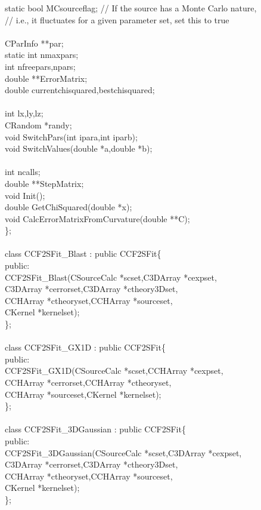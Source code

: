 \documentclass[10pt]{article}
\def\tab{\hspace*{9pt}}
\begin{document}
{\tab\tab  static bool MCsourceflag; // If the source has a Monte Carlo nature,\\ 
\tab\tab  // i.e., it fluctuates for a given parameter set, set this to true\\
\\
\tab\tab  CParInfo **par;\\
\tab\tab  static int nmaxpars;\\
\tab\tab  int nfreepars,npars;\\
\tab\tab  double **ErrorMatrix;\\
\tab\tab  double currentchisquared,bestchisquared;\\
\\
\tab\tab  int lx,ly,lz;\\
\tab\tab  CRandom *randy;\\
\tab\tab  void SwitchPars(int ipara,int iparb);\\
\tab\tab  void SwitchValues(double *a,double *b);\\
\\
\tab\tab  int ncalls;\\
\tab\tab  double **StepMatrix;\\
\tab\tab  void Init();\\
\tab\tab  double GetChiSquared(double *x);\\
\tab\tab  void CalcErrorMatrixFromCurvature(double **C);\\
\};\\
\\
class CCF2SFit\_Blast : public CCF2SFit\{\\
\tab public:\\
\tab\tab  CCF2SFit\_Blast(CSourceCalc *scset,C3DArray *cexpset,\\
\tab\tab		 C3DArray *cerrorset,C3DArray *ctheory3Dset,\\
\tab\tab		 CCHArray *ctheoryset,CCHArray *sourceset,\\
\tab\tab		 CKernel *kernelset);\\
\};\\
\\
class CCF2SFit\_GX1D : public CCF2SFit\{\\
\tab public:\\
\tab\tab  CCF2SFit\_GX1D(CSourceCalc *scset,CCHArray *cexpset,\\
\tab\tab		CCHArray *cerrorset,CCHArray *ctheoryset,\\
\tab\tab		CCHArray *sourceset,CKernel *kernelset);\\
\};\\
\\
class CCF2SFit\_3DGaussian : public CCF2SFit\{\\
\tab public:\\
\tab\tab  CCF2SFit\_3DGaussian(CSourceCalc *scset,C3DArray *cexpset,\\
\tab\tab		      C3DArray *cerrorset,C3DArray *ctheory3Dset,\\
\tab\tab		      CCHArray *ctheoryset,CCHArray *sourceset,\\
\tab\tab		      CKernel *kernelset);\\
\};\\
}
\end{document}
